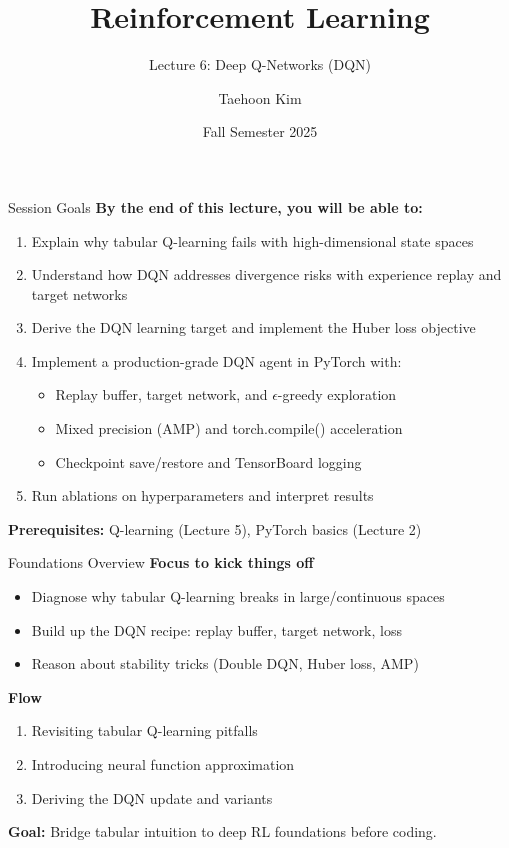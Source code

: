 \documentclass[aspectratio=169,10pt]{beamer}
\title{Reinforcement Learning}
\subtitle{Lecture 6: Deep Q-Networks (DQN)}
\author{Taehoon Kim}
\institute{Sogang University MIMIC Lab \\ \url{https://mimic-lab.com}}
\date{Fall Semester 2025}
\begin{document}
\frame{\titlepage}


\begin{frame}{Session Goals}
\textbf{By the end of this lecture, you will be able to:}
\begin{enumerate}
    \item Explain why tabular Q-learning fails with high-dimensional state spaces
    \item Understand how DQN addresses divergence risks with experience replay and target networks
    \item Derive the DQN learning target and implement the Huber loss objective
    \item Implement a production-grade DQN agent in PyTorch with:
    \begin{itemize}
        \item Replay buffer, target network, and $\epsilon$-greedy exploration
        \item Mixed precision (AMP) and torch.compile() acceleration
        \item Checkpoint save/restore and TensorBoard logging
    \end{itemize}
    \item Run ablations on hyperparameters and interpret results
\end{enumerate}

\vspace{0.3cm}
\textbf{Prerequisites:} Q-learning (Lecture 5), PyTorch basics (Lecture 2)
\end{frame}

\begin{frame}{Foundations Overview}
\textbf{Focus to kick things off}
\begin{itemize}
    \item Diagnose why tabular Q-learning breaks in large/continuous spaces
    \item Build up the DQN recipe: replay buffer, target network, loss
    \item Reason about stability tricks (Double DQN, Huber loss, AMP)
\end{itemize}

\vspace{0.3cm}
\textbf{Flow}
\begin{enumerate}
    \item Revisiting tabular Q-learning pitfalls
    \item Introducing neural function approximation
    \item Deriving the DQN update and variants
\end{enumerate}

\vspace{0.3cm}
\textbf{Goal:} Bridge tabular intuition to deep RL foundations before coding.
\end{frame}
\end{document}
